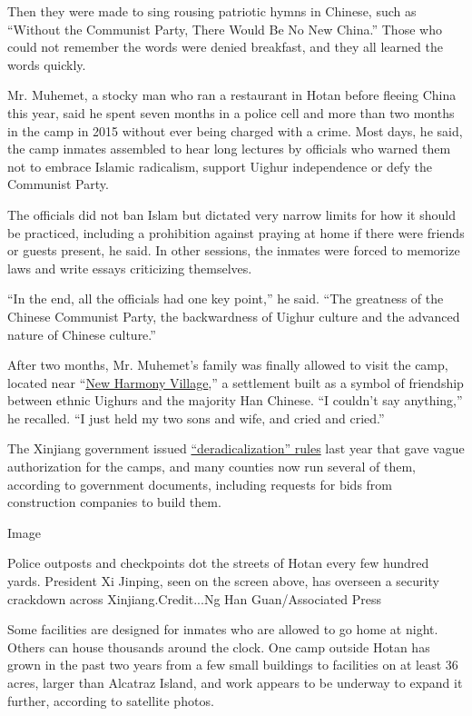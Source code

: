 Then they were made to sing rousing patriotic hymns in Chinese, such as
``Without the Communist Party, There Would Be No New China.'' Those who
could not remember the words were denied breakfast, and they all learned
the words quickly.

Mr. Muhemet, a stocky man who ran a restaurant in Hotan before fleeing
China this year, said he spent seven months in a police cell and more
than two months in the camp in 2015 without ever being charged with a
crime. Most days, he said, the camp inmates assembled to hear long
lectures by officials who warned them not to embrace Islamic radicalism,
support Uighur independence or defy the Communist Party.

The officials did not ban Islam but dictated very narrow limits for how
it should be practiced, including a prohibition against praying at home
if there were friends or guests present, he said. In other sessions, the
inmates were forced to memorize laws and write essays criticizing
themselves.

``In the end, all the officials had one key point,'' he said. ``The
greatness of the Chinese Communist Party, the backwardness of Uighur
culture and the advanced nature of Chinese culture.''

After two months, Mr. Muhemet's family was finally allowed to visit the
camp, located near
``\href{https://www.thepaper.cn/newsDetail_forward_1266895}{New Harmony
Village},'' a settlement built as a symbol of friendship between ethnic
Uighurs and the majority Han Chinese. ``I couldn't say anything,'' he
recalled. ``I just held my two sons and wife, and cried and cried.''

The Xinjiang government issued
\href{http://xj.people.com.cn/n2/2017/0330/c186332-29942874.html}{``deradicalization''
rules} last year that gave vague authorization for the camps, and many
counties now run several of them, according to government documents,
including requests for bids from construction companies to build them.

Image

Police outposts and checkpoints dot the streets of Hotan every few
hundred yards. President Xi Jinping, seen on the screen above, has
overseen a security crackdown across Xinjiang.Credit...Ng Han
Guan/Associated Press

Some facilities are designed for inmates who are allowed to go home at
night. Others can house thousands around the clock. One camp outside
Hotan has grown in the past two years from a few small buildings to
facilities on at least 36 acres, larger than Alcatraz Island, and work
appears to be underway to expand it further, according to satellite
photos.

